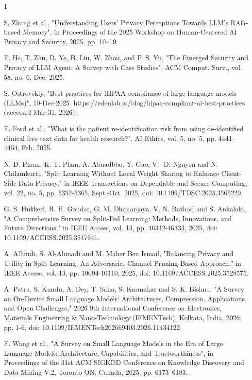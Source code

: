 \documentclass[lettersize,journal]{IEEEtran}
\begin{document}
\begin{thebibliography}{1}


S. Zhang et al., "Understanding Users’ Privacy Perceptions Towards LLM’s RAG-based Memory", in Proceedings of the 2025 Workshop on Human-Centered AI Privacy and Security, 2025, pp. 10–19.

F. He, T. Zhu, D. Ye, B. Liu, W. Zhou, and P. S. Yu, "The Emerged Security and Privacy of LLM Agent: A Survey with Case Studies", ACM Comput. Surv., vol. 58, no. 6, Dec. 2025.

S. Ostrovskiy, "Best practices for HIPAA compliance of large language models (LLMs)", 10-Dec-2025. https://edenlab.io/blog/hipaa-compliant-ai-best-practices (accessed Mar 31, 2026).

E. Ford et al., "What is the patient re-identification risk from using de-identified clinical free text data for health research?", AI Ethics, vol. 5, no. 5, pp. 4441–4454, Feb. 2025.

N. D. Pham, K. T. Phan, A. Abuadbba, Y. Gao, V. -D. Nguyen and N. Chilamkurti, "Split Learning Without Local Weight Sharing to Enhance Client-Side Data Privacy," in IEEE Transactions on Dependable and Secure Computing, vol. 22, no. 5, pp. 5352-5365, Sept.-Oct. 2025, doi: 10.1109/TDSC.2025.3565229.

G. S. Hukkeri, R. H. Goudar, G. M. Dhananjaya, V. N. Rathod and S. Ankalaki, "A Comprehensive Survey on Split-Fed Learning: Methods, Innovations, and Future Directions," in IEEE Access, vol. 13, pp. 46312-46333, 2025, doi: 10.1109/ACCESS.2025.3547641.

A. Alhindi, S. Al-Ahmadi and M. Maher Ben Ismail, "Balancing Privacy and Utility in Split Learning: An Adversarial Channel Pruning-Based Approach," in IEEE Access, vol. 13, pp. 10094-10110, 2025, doi: 10.1109/ACCESS.2025.3528575.

A. Patra, S. Kundu, A. Dey, T. Saha, S. Karmakar and S. K. Bishnu, "A Survey on On-Device Small Language Models: Architectures, Compression, Applications, and Open Challenges," 2026 9th International Conference on Electronics, Materials Engineering \& Nano-Technology (IEMENTech), Kolkata, India, 2026, pp. 1-6, doi: 10.1109/IEMENTech202669403.2026.11434122.

F. Wang et al., "A Survey on Small Language Models in the Era of Large Language Models: Architecture, Capabilities, and Trustworthiness", in Proceedings of the 31st ACM SIGKDD Conference on Knowledge Discovery and Data Mining V.2, Toronto ON, Canada, 2025, pp. 6173–6183.


\end{thebibliography}
\end{document}
